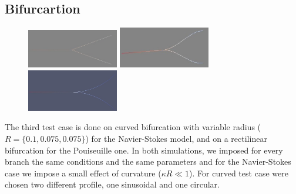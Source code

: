 \documentclass[a4paper]{report}
\begin{document}
\subsection{Bifurcartion}

\begin{figure}[htbp]
\centering
\includegraphics[width= 40mm]{Bifurcation_Rettilineo}%
\qquad \qquad
\includegraphics[width= 40mm]{Bifurcation_Curvo}%
\qquad \qquad
\includegraphics[width= 40mm]{Circular_Bifurcation}%
\end{figure}
The third test case is done on curved bifurcation with variable radius ($R=\{0.1 ,0.075,0.075\}$) for the Navier-Stokes model, and on a rectilinear bifurcation for the Pouiseuille one. In both simulations, we imposed for every branch the same conditions and the same parameters and for the Navier-Stokes case we impose a small effect of curvature ($\kappa R \ll1$). For curved test case were chosen two different profile, one sinusoidal and one circular.
\end{document}
